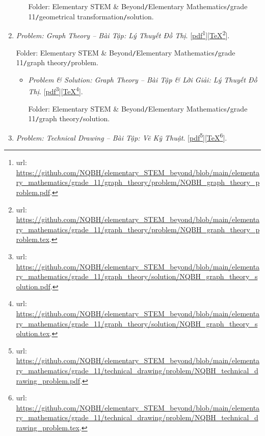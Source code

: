 \documentclass[12pt,oneside]{book}
\begin{document}
\begin{enumerate}
\begin{itemize}
		Folder: {\sf Elementary STEM \& Beyond{\tt/}Elementary Mathematics{\tt/}grade 11{\tt/}geometrical transformation{\tt/}solution}.
	\end{itemize}
	\item {\it Problem: Graph Theory -- Bài Tập: Lý Thuyết Đồ Thị}. [\href{https://github.com/NQBH/elementary_STEM_beyond/blob/main/elementary_mathematics/grade_11/graph_theory/problem/NQBH_graph_theory_problem.pdf}{pdf}\footnote{{\sc url}: \url{https://github.com/NQBH/elementary_STEM_beyond/blob/main/elementary_mathematics/grade_11/graph_theory/problem/NQBH_graph_theory_problem.pdf}.}][\href{https://github.com/NQBH/elementary_STEM_beyond/blob/main/elementary_mathematics/grade_11/graph_theory/problem/NQBH_graph_theory_problem.tex}{\TeX}\footnote{{\sc url}: \url{https://github.com/NQBH/elementary_STEM_beyond/blob/main/elementary_mathematics/grade_11/graph_theory/problem/NQBH_graph_theory_problem.tex}.}].
	
	Folder: {\sf Elementary STEM \& Beyond{\tt/}Elementary Mathematics{\tt/}grade 11{\tt/}graph theory{\tt/}problem}.
	\begin{itemize}
		\item {\it Problem \& Solution: Graph Theory -- Bài Tập \& Lời Giải: Lý Thuyết Đồ Thị}. [\href{https://github.com/NQBH/elementary_STEM_beyond/blob/main/elementary_mathematics/grade_11/graph_theory/solution/NQBH_graph_theory_solution.pdf}{pdf}\footnote{{\sc url}: \url{https://github.com/NQBH/elementary_STEM_beyond/blob/main/elementary_mathematics/grade_11/graph_theory/solution/NQBH_graph_theory_solution.pdf}.}][\href{https://github.com/NQBH/elementary_STEM_beyond/blob/main/elementary_mathematics/grade_11/graph_theory/solution/NQBH_graph_theory_solution.tex}{\TeX}\footnote{{\sc url}: \url{https://github.com/NQBH/elementary_STEM_beyond/blob/main/elementary_mathematics/grade_11/graph_theory/solution/NQBH_graph_theory_solution.tex}.}].
		
		Folder: {\sf Elementary STEM \& Beyond{\tt/}Elementary Mathematics{\tt/}grade 11{\tt/}graph theory{\tt/}solution}.
	\end{itemize}
	\item {\it Problem: Technical Drawing -- Bài Tập: Vẽ Kỹ Thuật}. [\href{https://github.com/NQBH/elementary_STEM_beyond/blob/main/elementary_mathematics/grade_11/technical_drawing/problem/NQBH_technical_drawing_problem.pdf}{pdf}\footnote{{\sc url}: \url{https://github.com/NQBH/elementary_STEM_beyond/blob/main/elementary_mathematics/grade_11/technical_drawing/problem/NQBH_technical_drawing_problem.pdf}.}][\href{https://github.com/NQBH/elementary_STEM_beyond/blob/main/elementary_mathematics/grade_11/technical_drawing/problem/NQBH_technical_drawing_problem.tex}{\TeX}\footnote{{\sc url}: \url{https://github.com/NQBH/elementary_STEM_beyond/blob/main/elementary_mathematics/grade_11/technical_drawing/problem/NQBH_technical_drawing_problem.tex}.}].
	

\end{enumerate}
\end{document}
